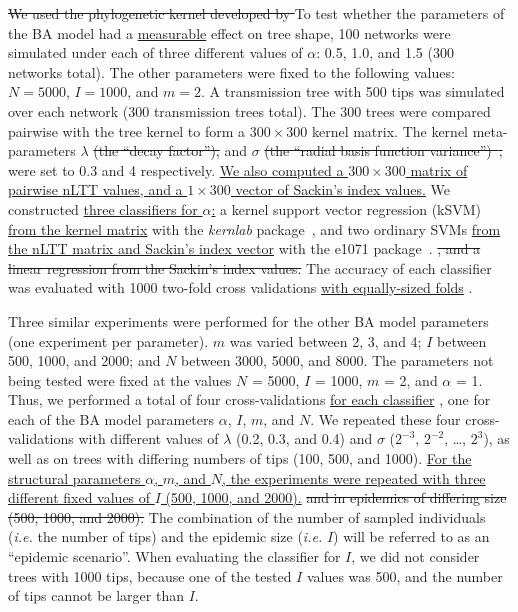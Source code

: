 \documentclass[12pt]{article}\usepackage[]{graphicx}\usepackage[]{color}
\newcommand{\add}[1]{\color{blue} \uline{#1} \color{black}}
\newcommand{\del}[1]{\color{red} \sout{#1} \color{black}}
\begin{document}
\del{We used the phylogenetic kernel developed by \textcite{poon2013mapping}}
To test whether the parameters of the BA model had a \add{measurable} effect on
tree shape, 100 networks were simulated under each of three different values of
$\alpha$: 0.5, 1.0, and 1.5 (300 networks total). The other parameters were
fixed to the following values: $N = 5000$, $I = 1000$, and $m = 2$. A
transmission tree with 500 tips was simulated over each network (300
transmission trees total). The 300 trees were compared pairwise with the tree
kernel to form a $300 \times 300$ kernel matrix. The kernel meta-parameters
$\lambda$ \del{(the ``decay factor''),} and $\sigma$ \del{(the ``radial basis
function variance'')~\autocite[see][]{poon2013mapping},} were set to 0.3 and 4
respectively. \add{We also computed a $300 \times 300$ matrix of pairwise nLTT
values, and a $1 \times 300$ vector of Sackin's index values.} We constructed 
\add{three classifiers for $\alpha$:} a kernel support vector regression (kSVM)
\add{from the kernel matrix} with the \textit{kernlab}
package~\autocite{zeileis2004kernlab}, and two ordinary SVMs \add{from the nLTT
matrix and Sackin's index vector} with the e1071
package~\autocite{meyer2015e1071}.\del{, and a linear regression from the
Sackin's index values.} The accuracy of each classifier was evaluated with 1000
two-fold cross validations \add{with equally-sized folds}.
  
Three similar experiments were performed for the other BA model parameters (one
experiment per parameter). $m$ was varied between 2, 3, and 4; $I$ between 500,
1000, and 2000; and $N$ between 3000, 5000, and 8000. The parameters not being
tested were fixed at the values $N$ = 5000, $I$ = 1000, $m$ = 2, and $\alpha$ =
1. Thus, we performed a total of four cross-validations \add{for each
classifier}, one for each of the BA model parameters $\alpha$, $I$, $m$, and
$N$. We repeated these four cross-validations with different values of
$\lambda$ (0.2, 0.3, and 0.4) and $\sigma$ ($2^{-3}$, $2^{-2}$, \ldots, $2^3$),
as well as on trees with differing numbers of tips (100, 500, and 1000).
\add{For the structural parameters $\alpha$, $m$, and $N$, the experiments were
repeated with three different fixed values of $I$ (500, 1000, and 2000).}
\del{and in epidemics of differing size (500, 1000, and 2000).} The combination
of the number of sampled individuals (\textit{i.e.} the number of tips) and the
epidemic size (\textit{i.e.} $I$) will be referred to as an ``epidemic
scenario''. When evaluating the classifier for $I$, we did not consider trees
with 1000 tips, because one of the tested $I$ values was 500, and the number of
tips cannot be larger than $I$.
\end{document}
